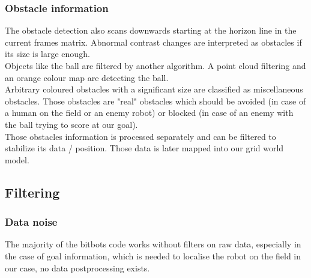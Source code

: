 \documentclass[lnicst,a4paper]{svmultln}
\begin{document}
\subsubsection{Obstacle information}
The obstacle detection also scans downwards starting at the horizon line in the current frames matrix. Abnormal contrast changes are interpreted as obstacles if its size is large enough.
\\
Objects like the ball are filtered by another algorithm. A point cloud filtering and an orange colour map are detecting the ball.
\\
Arbitrary coloured obstacles with a significant size are classified as miscellaneous obstacles. Those obstacles are "real" obstacles which should be avoided (in case of a human on the field or an enemy robot) or blocked (in case of an enemy with the ball trying to score at our goal).
\\
Those obstacles information is processed separately and can be filtered to stabilize its data / position. Those data is later mapped into our grid world model.





\subsection{Filtering}

\subsubsection{Data noise}
The majority of the bitbots code works without filters on raw data, especially in the case of goal information, which is needed to localise the robot on the field in our case, no data postprocessing exists.
\end{document}
